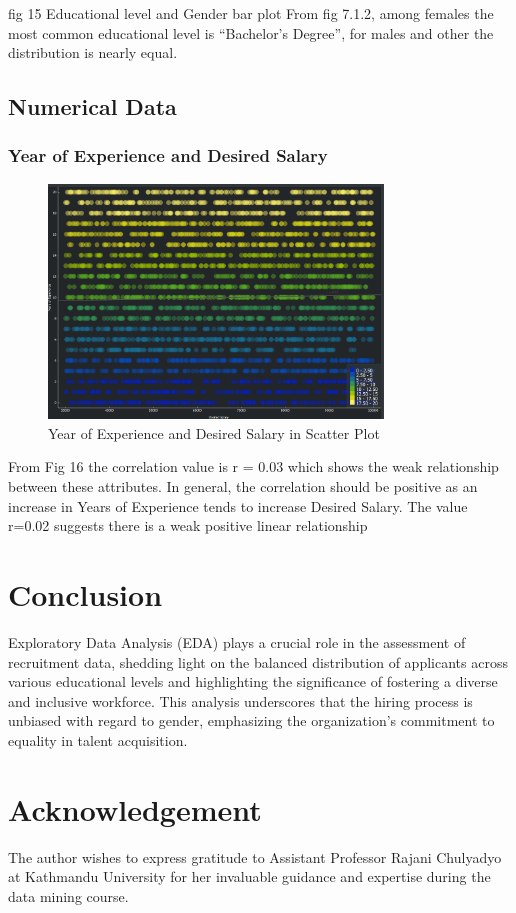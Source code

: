 \documentclass[lettersize,journal]{IEEEtran}
\begin{document}
fig 15 Educational level and Gender bar plot
From fig 7.1.2, among females the most common
educational level is “Bachelor’s Degree”, for males and other
the distribution is nearly equal.

\subsection{Numerical Data}
\subsubsection{Year of Experience and Desired Salary }


\begin{figure}[h]
\centering
\includegraphics[width=3.5in]{scatterplot1.png}
\caption{Year of Experience and Desired Salary in Scatter Plot}
\label{fig_14}
\end{figure}

From Fig 16 the correlation value is r = 0.03 which
shows the weak relationship between these attributes. In
general, the correlation should be positive as an increase in
Years of Experience tends to increase Desired Salary. The
value r=0.02 suggests there is a weak positive linear
relationship
 
\section{Conclusion}
Exploratory Data Analysis (EDA) plays a crucial role in the assessment of recruitment data, shedding light on the balanced distribution of applicants across various educational levels and highlighting the significance of fostering a diverse and inclusive workforce. This analysis underscores that the hiring process is unbiased with regard to gender, emphasizing the organization's commitment to equality in talent acquisition.

\section*{Acknowledgement}
The author wishes to express gratitude to Assistant Professor Rajani Chulyadyo at Kathmandu University for her invaluable guidance and expertise during the data mining course.
\end{document}
